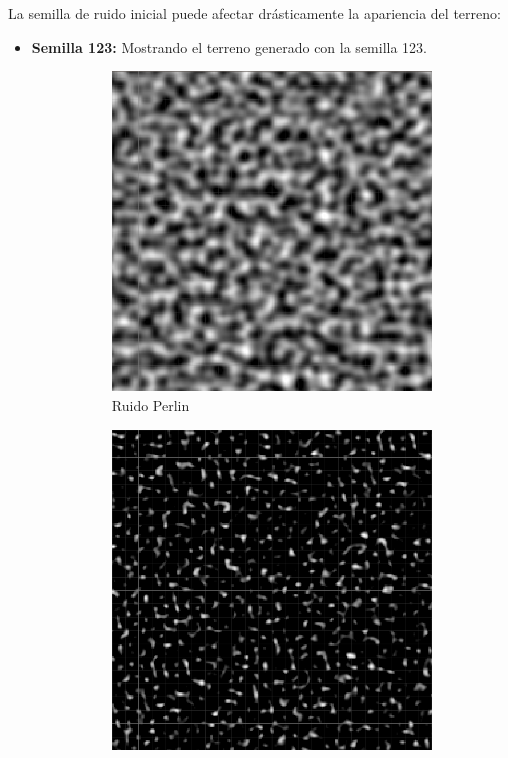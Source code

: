 La semilla de ruido inicial puede afectar drásticamente la apariencia del terreno:

\begin{itemize}
    \item \textbf{Semilla 123:} Mostrando el terreno generado con la semilla 123.
    \begin{figure}[ht]
        \begin{subfigure}{0.3\linewidth}
            \centering
            \includegraphics[width=\linewidth]{img/codes/Perlin123.png}
            \caption{Ruido Perlin}
        \end{subfigure}
        \hfill
        \begin{subfigure}{0.3\linewidth}
            \centering
            \includegraphics[width=\linewidth]{img/codes/Simplex123.png}

\end{subfigure}
\end{figure}
\end{itemize}
